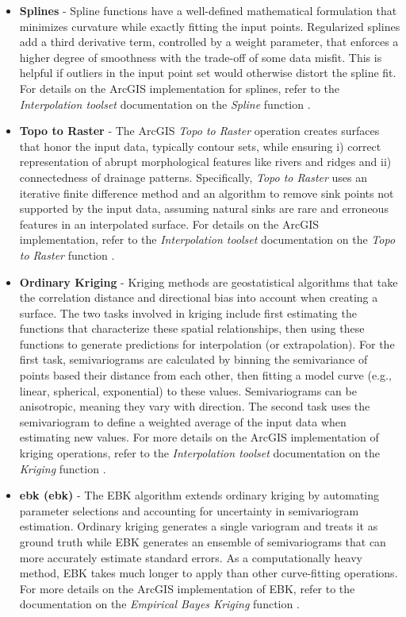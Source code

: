 \begin{itemize}
\item{\textbf{Splines}}\label{ch3:splines} - Spline functions have a well-defined mathematical formulation that minimizes curvature while exactly fitting the input points. Regularized splines add a third derivative term, controlled by a weight parameter, that enforces a higher degree of smoothness with the trade-off of some data misfit. This is helpful if outliers in the input point set would otherwise distort the spline fit. For details on the ArcGIS implementation for splines, refer to the \textit{Interpolation toolset} documentation on the \textit{Spline} function \citep{esri_spline_2021}.
\item{\textbf{Topo to Raster}}\label{ch3:topo2r} - The ArcGIS \textit{Topo to Raster} operation creates surfaces that honor the input data, typically contour sets, while ensuring i) correct representation of abrupt morphological features like rivers and ridges and ii) connectedness of drainage patterns. Specifically, \textit{Topo to Raster} uses an iterative finite difference method and an algorithm to remove sink points not supported by the input data, assuming natural sinks are rare and erroneous features in an interpolated surface. For details on the ArcGIS implementation, refer to the \textit{Interpolation toolset} documentation on the \textit{Topo to Raster} function \citep{esri_topo_2021}.
\item{\textbf{Ordinary Kriging}}\label{ch3:kriging} - Kriging methods are geostatistical algorithms that take the correlation distance and directional bias into account when creating a surface. The two tasks involved in kriging include first estimating the functions that characterize these spatial relationships, then using these functions to generate predictions for interpolation (or extrapolation). For the first task, semivariograms are calculated by binning the semivariance of points based their distance from each other, then fitting a model curve (e.g., linear, spherical, exponential) to these values. Semivariograms can be anisotropic, meaning they vary with direction. The second task uses the semivariogram to define a weighted average of the input data when estimating new values. For more details on the ArcGIS implementation of kriging operations, refer to the \textit{Interpolation toolset} documentation on the \textit{Kriging} function \citep{esri_kriging_2021}.
\item{\textbf{\acrlong{ebk} (\acrshort{ebk})}}\label{ch3:ebk} - The EBK algorithm extends ordinary kriging by automating parameter selections and accounting for uncertainty in semivariogram estimation. Ordinary kriging generates a single variogram and treats it as ground truth while EBK generates an ensemble of semivariograms that can more accurately estimate standard errors. As a computationally heavy method, EBK takes much longer to apply than other curve-fitting operations. For more details on the ArcGIS implementation of EBK, refer to the documentation on the \textit{Empirical Bayes Kriging} function \citep{esri_empirical_2021}.
\end{itemize}

